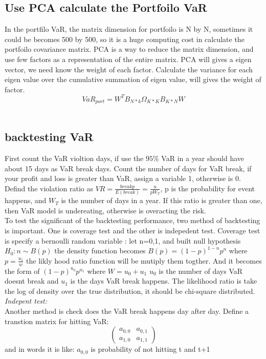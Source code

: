 \documentclass[a4paper,11pt]{article}
\begin{document}
\subsection{Use PCA calculate the Portfoilo VaR}
In the portfilo VaR, the matrix dimension for portfoilo is N by N, sometimes it could be becomes 500 by 500, so it is a huge computing cost in calculate the portfoilo covariance matrix. PCA is a way to reduce the matrix dimension, and use few factors as a representation of the entire matrix. PCA will gives a eigen vector, we need know the weight of each factor. Calculate the variance for each eigen value over the cumulative summation of eigen value, will gives the weight of factor.
$$ VaR_{port}=W^T B_{N*k}  \Omega_{K*K}  B_{K*N}  W $$\\
\subsection{backtesting VaR}
First count the VaR violtion days, if use the $95\% $ VaR in a year should have about 15 days as VaR break days. Count the number of days for VaR break, if your profit and loss is greater than VaR, assign a variable 1, otherwise is 0. Defind the violation ratio as $VR=\frac{breakp}{E(break)}=\frac{u}{p W_T}$, p is the probability for event happens, and $W_T$ is the number of days in a year. If this ratio is greater than one, then VaR model is undereating, otherwise is overacting the risk.\\
To test the significant of the backtesting performance, two method of backtesting is important. One is coverage test and the other is indepedent test. Coverage test is specify a bernoulli random variable :
let n=0,1, and built null hypothesis $H_0: n \sim B(p)$ the density function becomes $ B(p)=(1-p)^{1-n}p^{n}$ where $p=\frac{u_1}{w}$ the likly hood ratio function will be mutiply them togther. And it becomes the form of $(1-p)^{u_0} p^{u_1}$ where $W=u_0+u_1$ $u_0$ is the number of days VaR doesnt break and $u_1$ is the days VaR break happens. The likelihood ratio is take the log of density over the true distribution, it should be chi-square distributed.\\
{\em Indepent test:}\\
Another method is check does the VaR break happens day after day. Define a transtion matrix for hitting VaR:
$$
\begin{pmatrix}
a_{0,0} & a_{0,1} \\
a_{1,0} & a_{1,1}
\end{pmatrix}
$$
and in words it is like: $a_{0,0}$ is probability of not hitting t and t+1\\
\end{document}
